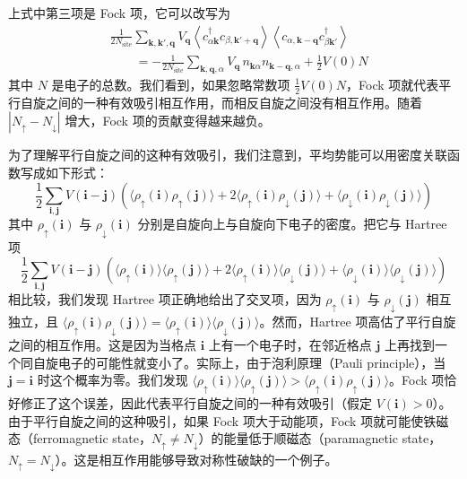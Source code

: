 上式中第三项是 Fock 项，它可以改写为
\begin{align*}
&\frac{1}{2N_{\mathrm{site}}}\sum_{\pmb{k},\pmb{k}',\pmb{q}} V_{\pmb{q}} \left\langle c^{\dagger}_{\alpha\pmb{k}} c_{\beta,\pmb{k}'+\pmb{q}} \right\rangle \left\langle c_{\alpha,\pmb{k}-\pmb{q}} c^{\dagger}_{\beta\pmb{k}'} \right\rangle \\
&\qquad = -\frac{1}{2N_{\mathrm{site}}}\sum_{\pmb{k},\pmb{q},\alpha} V_{\pmb{q}}\, n_{\pmb{k}\alpha} n_{\pmb{k}-\pmb{q},\alpha} + \frac{1}{2} V(0) N
\end{align*}
其中 $N$ 是电子的总数。我们看到，如果忽略常数项 $\frac{1}{2}V(0)N$，Fock 项就代表平行自旋之间的一种有效吸引相互作用，而相反自旋之间没有相互作用。随着 $|N_{\uparrow}-N_{\downarrow}|$ 增大，Fock 项的贡献变得越来越负。

为了理解平行自旋之间的这种有效吸引，我们注意到，平均势能可以用密度关联函数写成如下形式：
\begin{equation*}
\frac{1}{2}\sum_{\pmb{i},\pmb{j}} V(\pmb{i}-\pmb{j}) \left( \langle \rho_{\uparrow}(\pmb{i})\rho_{\uparrow}(\pmb{j}) \rangle + 2\langle \rho_{\uparrow}(\pmb{i})\rho_{\downarrow}(\pmb{j}) \rangle + \langle \rho_{\downarrow}(\pmb{i})\rho_{\downarrow}(\pmb{j}) \rangle \right)
\end{equation*}
其中 $\rho_{\uparrow}(\pmb{i})$ 与 $\rho_{\downarrow}(\pmb{i})$ 分别是自旋向上与自旋向下电子的密度。把它与 Hartree 项
\begin{equation*}
\frac{1}{2}\sum_{\pmb{i},\pmb{j}} V(\pmb{i}-\pmb{j}) \left( \langle \rho_{\uparrow}(\pmb{i}) \rangle \langle \rho_{\uparrow}(\pmb{j}) \rangle + 2\langle \rho_{\uparrow}(\pmb{i}) \rangle \langle \rho_{\downarrow}(\pmb{j}) \rangle + \langle \rho_{\downarrow}(\pmb{i}) \rangle \langle \rho_{\downarrow}(\pmb{j}) \rangle \right)
\end{equation*}
相比较，我们发现 Hartree 项正确地给出了交叉项，因为 $\rho_{\uparrow}(\pmb{i})$ 与 $\rho_{\downarrow}(\pmb{j})$ 相互独立，且 $\langle\rho_{\uparrow}(\pmb{i})\rho_{\downarrow}(\pmb{j})\rangle = \langle\rho_{\uparrow}(\pmb{i})\rangle \langle\rho_{\downarrow}(\pmb{j})\rangle$。然而，Hartree 项高估了平行自旋之间的相互作用。这是因为当格点 $\pmb{i}$ 上有一个电子时，在邻近格点 $\pmb{j}$ 上再找到一个同自旋电子的可能性就变小了。实际上，由于泡利原理（Pauli principle），当 $\pmb{j}=\pmb{i}$ 时这个概率为零。我们发现 $\langle\rho_{\uparrow}(\pmb{i})\rangle \langle\rho_{\uparrow}(\pmb{j})\rangle > \langle\rho_{\uparrow}(\pmb{i})\rho_{\uparrow}(\pmb{j})\rangle$。Fock 项恰好修正了这个误差，因此代表平行自旋之间的一种有效吸引（假定 $V(\pmb{i})>0$）。由于平行自旋之间的这种吸引，如果 Fock 项大于动能项，Fock 项就可能使铁磁态（ferromagnetic state，$N_{\uparrow}\neq N_{\downarrow}$）的能量低于顺磁态（paramagnetic state，$N_{\uparrow}=N_{\downarrow}$）。这是相互作用能够导致对称性破缺的一个例子。

